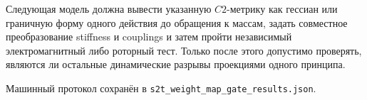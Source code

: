 \begin{protocol}
Следующая модель должна вывести указанную \(C2\)-метрику как гессиан или
граничную форму одного действия до обращения к массам, задать совместное
преобразование stiffness и couplings и затем пройти независимый
электромагнитный либо роторный тест. Только после этого допустимо проверять,
являются ли остальные динамические разрывы проекциями одного принципа.
\end{protocol}

Машинный протокол сохранён в
\texttt{s2t\_weight\_map\_gate\_results.json}.
